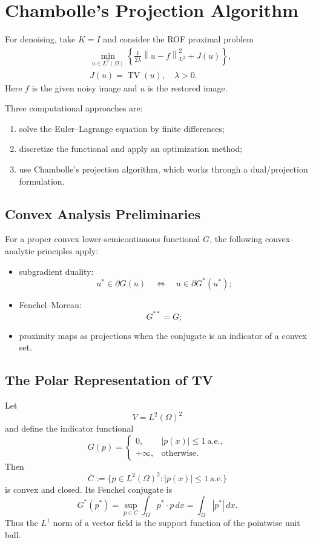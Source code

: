 \documentclass[11pt]{article}
\newcommand{\Om}{\Omega}
\newcommand{\TV}{\operatorname{TV}}
\newcommand{\norm}[2][]{\left\lVert #2\right\rVert_{#1}}
\theoremstyle{definition}
\theoremstyle{plain}
\begin{document}
\section{Chambolle's Projection Algorithm}

For denoising, take $K=I$ and consider the ROF proximal problem
\begin{align*}
&\min_{u\in L^2(\Om)}
\left\{
\frac{1}{2\lambda}\norm[L^2]{u-f}^2+J(u)
\right\},\\
&J(u)=\TV(u),\quad \lambda>0.
\end{align*}
Here $f$ is the given noisy image and $u$ is the restored image.

Three computational approaches are:
\begin{enumerate}
\item solve the Euler--Lagrange equation by finite differences;
\item discretize the functional and apply an optimization method;
\item use Chambolle's projection algorithm, which works through a dual/projection formulation.
\end{enumerate}

\subsection{Convex Analysis Preliminaries}
For a proper convex lower-semicontinuous functional $G$, the following convex-analytic principles apply:
\begin{itemize}
\item subgradient duality:
\[
 u^*\in\partial G(u)
 \quad\Longleftrightarrow\quad
 u\in\partial G^*(u^*);
\]
\item Fenchel--Moreau:
\[
G^{**}=G;
\]
\item proximity maps as projections when the conjugate is an indicator of a convex set.
\end{itemize}

\subsection{The Polar Representation of TV}
Let
\[
V=L^2(\Om)^2
\]
and define the indicator functional
\[
G(p)=
\begin{cases}
0,& |p(x)|\le1\ \text{a.e.},\\
+\infty,&\text{otherwise}.
\end{cases}
\]
Then
\[
C:=\{p\in L^2(\Om)^2:|p(x)|\le1\ \text{a.e.}\}
\]
is convex and closed. Its Fenchel conjugate is
\[
G^*(p^*)
=\sup_{p\in C}\int_{\Om}p^*\cdot p\,dx
=\int_{\Om}|p^*|\,dx.
\]
Thus the $L^1$ norm of a vector field is the support function of the pointwise unit ball.
\end{document}
